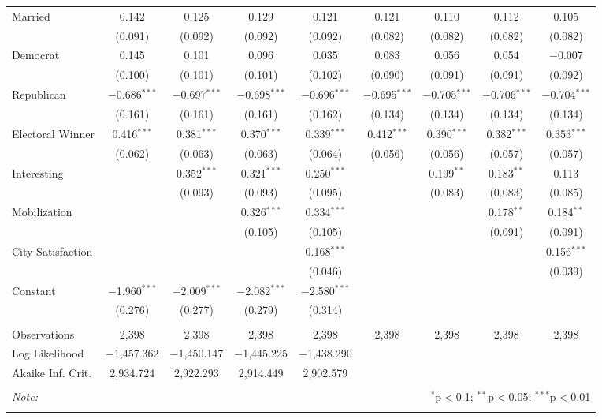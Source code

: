 \documentclass{article}
\begin{document}
\begin{landscape}
\begin{table}[!htbp]
\begin{tabular}{@{\extracolsep{5pt}}lcccccccc}
  Married & 0.142 & 0.125 & 0.129 & 0.121 & 0.121 & 0.110 & 0.112 & 0.105 \\ 
  & (0.091) & (0.092) & (0.092) & (0.092) & (0.082) & (0.082) & (0.082) & (0.082) \\ 
  Democrat & 0.145 & 0.101 & 0.096 & 0.035 & 0.083 & 0.056 & 0.054 & $-$0.007 \\ 
  & (0.100) & (0.101) & (0.101) & (0.102) & (0.090) & (0.091) & (0.091) & (0.092) \\ 
  Republican & $-$0.686$^{***}$ & $-$0.697$^{***}$ & $-$0.698$^{***}$ & $-$0.696$^{***}$ & $-$0.695$^{***}$ & $-$0.705$^{***}$ & $-$0.706$^{***}$ & $-$0.704$^{***}$ \\ 
  & (0.161) & (0.161) & (0.161) & (0.162) & (0.134) & (0.134) & (0.134) & (0.134) \\ 
  Electoral Winner & 0.416$^{***}$ & 0.381$^{***}$ & 0.370$^{***}$ & 0.339$^{***}$ & 0.412$^{***}$ & 0.390$^{***}$ & 0.382$^{***}$ & 0.353$^{***}$ \\ 
  & (0.062) & (0.063) & (0.063) & (0.064) & (0.056) & (0.056) & (0.057) & (0.057) \\ 
  Interesting &  & 0.352$^{***}$ & 0.321$^{***}$ & 0.250$^{***}$ &  & 0.199$^{**}$ & 0.183$^{**}$ & 0.113 \\ 
  &  & (0.093) & (0.093) & (0.095) &  & (0.083) & (0.083) & (0.085) \\ 
  Mobilization &  &  & 0.326$^{***}$ & 0.334$^{***}$ &  &  & 0.178$^{**}$ & 0.184$^{**}$ \\ 
  &  &  & (0.105) & (0.105) &  &  & (0.091) & (0.091) \\ 
  City Satisfaction &  &  &  & 0.168$^{***}$ &  &  &  & 0.156$^{***}$ \\ 
  &  &  &  & (0.046) &  &  &  & (0.039) \\ 
  Constant & $-$1.960$^{***}$ & $-$2.009$^{***}$ & $-$2.082$^{***}$ & $-$2.580$^{***}$ &  &  &  &  \\ 
  & (0.276) & (0.277) & (0.279) & (0.314) &  &  &  &  \\ 
 \hline \\[-1.8ex] 
Observations & 2,398 & 2,398 & 2,398 & 2,398 & 2,398 & 2,398 & 2,398 & 2,398 \\ 
Log Likelihood & $-$1,457.362 & $-$1,450.147 & $-$1,445.225 & $-$1,438.290 &  &  &  &  \\ 
Akaike Inf. Crit. & 2,934.724 & 2,922.293 & 2,914.449 & 2,902.579 &  &  &  &  \\ 
\hline 
\hline \\[-1.8ex] 
\textit{Note:}  & \multicolumn{8}{r}{$^{*}$p$<$0.1; $^{**}$p$<$0.05; $^{***}$p$<$0.01} \\ 
\normalsize 
\end{tabular} 
\end{table} 
\end{landscape}
\end{document}
